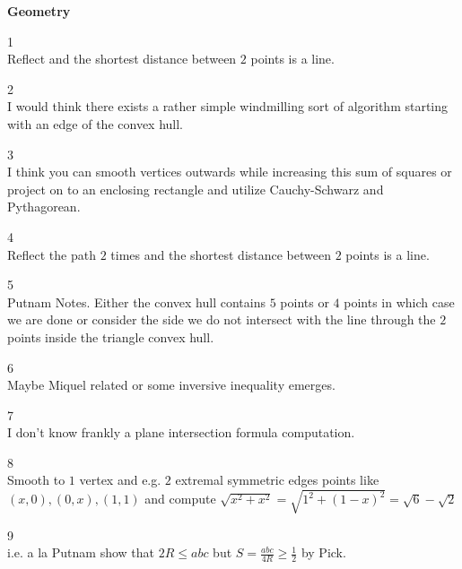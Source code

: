 \newpage

\textbf{Geometry}

1 \\
Reflect and the shortest distance between $2$ points is a line.

2 \\
I would think there exists a rather simple windmilling sort of algorithm starting with an edge of the convex hull.

3 \\
I think you can smooth vertices outwards while increasing this sum of squares or project on to an enclosing rectangle and utilize Cauchy-Schwarz and Pythagorean.

4 \\
Reflect the path $2$ times and the shortest distance between $2$ points is a line.

5 \\
Putnam Notes. Either the convex hull contains $5$ points or $4$ points in which case we are done or consider the side we do not intersect with the line through the $2$ points inside the triangle convex hull.

6 \\
Maybe Miquel related or some inversive inequality emerges.

7 \\
I don't know frankly a plane intersection formula computation.

8 \\
Smooth to $1$ vertex and e.g. $2$ extremal symmetric edges points like $(x,0),(0,x),(1,1)$ and compute $\sqrt{x^2+x^2}=\sqrt{1^2+(1-x)^2}=\boxed{\sqrt{6}-\sqrt{2}}$

9 \\
i.e. a la Putnam show that $2R \le abc$ but $S=\frac{abc}{4R}\ge \frac{1}{2}$ by Pick.